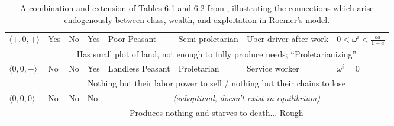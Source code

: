 \begin{table}[ht!]
{\begin{tabularx}{\textwidth}{|p{1.6cm}||p{1.4cm}XXp{1.8cm}XXp{2.2cm}|}
			$\langle +, 0, + \rangle$ & Yes & No & Yes & Poor Peasant & Semi-proletarian & Uber driver after work & $0 < \omega^i < \frac{ba}{1-a}$ \\
			& \multicolumn{7}{c|}{Has small plot of land, not enough to fully produce needs; ``Proletarianizing''} \\ \hline
			$\langle 0, 0, + \rangle$ & No & No & Yes & Landless Peasant & Proletarian & Service worker & $\omega^i = 0$ \\
			& \multicolumn{7}{c|}{Nothing but their labor power to sell / nothing but their chains to lose} \\ \hline
			$\langle 0, 0, 0 \rangle$ & No & No & No & \multicolumn{4}{c|}{\textit{(suboptimal, doesn't exist in equilibrium)}} \\
			& \multicolumn{7}{c|}{Produces nothing and starves to death... Rough} \\\hline
		\end{tabularx}
	}
	\caption{A combination and extension of Tables 6.1 and 6.2 from \cite{roemer_free_to_lose}, illustrating the connections which arise endogenously between class, wealth, and exploitation in Roemer's model.}
\end{table}